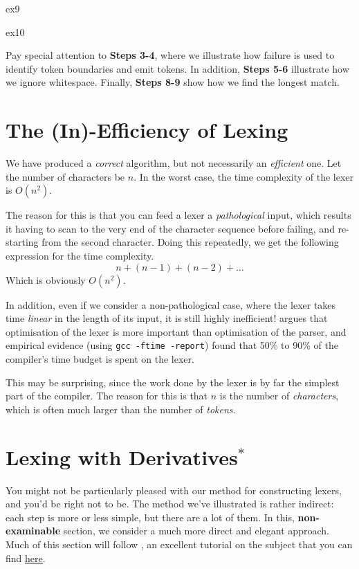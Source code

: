 \begin{minipage}{0.5\textwidth}
    {ex9}
\end{minipage}%
\begin{minipage}{0.5\textwidth}
    {ex10}
\end{minipage}

Pay special attention to \textbf{\textsf{Steps 3-4}}, where we illustrate how failure is used to identify token boundaries and emit tokens. In addition, \textbf{\textsf{Steps 5-6}} illustrate how we ignore whitespace. Finally, \textbf{\textsf{Steps 8-9}} show how we find the longest match.
    
\section{The (In)-Efficiency of Lexing}
We have produced a \emph{correct} algorithm, but not necessarily an \emph{efficient} one. Let the number of characters be $n$. In the worst case, the time complexity of the lexer is $O(n^2)$. 

The reason for this is that you can feed a lexer a \emph{pathological} input, which results it having to scan to the very end of the character sequence before failing, and re-starting from the second character. Doing this repeatedly, we get the following expression for the time complexity.
\[ n + (n-1) + (n-2) + \ldots \]
Which is obviously $O(n^2)$.

In addition, even if we consider a non-pathological case, where the lexer takes time \emph{linear} in the length of its input, it is still highly inefficient! \citet{sebesta-1993} argues that optimisation of the lexer is more important than optimisation of the parser, and empirical evidence (using \texttt{gcc -ftime -report}) found that 50\% to 90\% of the compiler's time budget is spent on the lexer.

This may be surprising, since the work done by the lexer is by far the simplest part of the compiler. The reason for this is that $n$ is the number of \emph{characters}, which is often much larger than the number of \emph{tokens}.

\section{Lexing with Derivatives$^{*}$}
You might not be particularly pleased with our method for constructing lexers, and you'd be right not to be. The method we've illustrated is rather indirect: each step is more or less simple, but there are a lot of them. In this, \textsf{\textbf{non-examinable}} section, we consider a much more direct and elegant approach. Much of this section will follow \citet{owens-2009}, an excellent tutorial on the subject that you can find \href{https://www.cambridge.org/core/journals/journal-of-functional-programming/article/regularexpression-derivatives-reexamined/E5734B86DEB96C61C69E5CF3C4FB0AFA}{here}.

